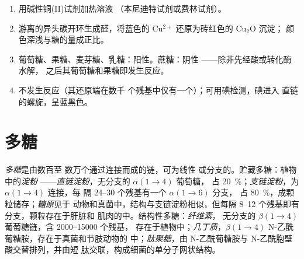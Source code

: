 \begin{method}[检验还原糖]\label{met:b1:carbohydrates:reducing}
\begin{enumerate}
  \item 用碱性铜(II)试剂加热溶液
        （本尼迪特试剂或费林试剂）。
  \item 游离的异头碳开环生成醛，将蓝色的
        $\mathrm{Cu^{2+}}$ 还原为砖红色的 $\mathrm{Cu_2O}$ 沉淀；
        颜色深浅与糖的量成正比。
  \item 葡萄糖、果糖、麦芽糖、乳糖：阳性。蔗糖：阴性
——除非先经酸或转化酶水解，
        之后其葡萄糖和果糖即发生反应。
  \item {}不发生反应（其还原端在数千
        个残基中仅有一个）；可用碘检测，碘进入
        直链的螺旋，呈蓝黑色。
\end{enumerate}
\end{method}

\section{多糖}

\begin{definition}[多糖]\label{def:b1:carbohydrates:polysaccharide}
\emph{多糖}是由数百至
数万个通过连接而成的链，可为线性
或分支的。贮藏多糖：植物中的\emph{淀粉}
——\emph{直链淀粉}，无分支的 $\alpha(1{\to}4)$ 葡萄糖，
占 \qty{20}{\%}；\emph{支链淀粉}，为 $\alpha(1{\to}4)$ 连接，每
隔 \qtyrange{24}{30}{} 个残基有一个 $\alpha(1{\to}6)$ 分支，
占 \qty{80}{\%}，成颗粒储存；\emph{糖原}见于
动物和真菌中，结构与支链淀粉相似，但每隔
\qtyrange{8}{12}{} 个残基即有分支，颗粒存在于肝脏和
肌肉的中。结构性多糖：\emph{纤维素}，
无分支的 $\beta(1{\to}4)$ 葡萄糖链，含 \qtyrange{2000}{15000}{} 个残基，
存在于植物中；\emph{几丁质}，$\beta(1{\to}4)$
N-乙酰葡糖胺，存在于真菌和节肢动物的
中；\emph{肽聚糖}，由
N-乙酰葡糖胺与 N-乙酰胞壁酸交替排列，并由短
肽交联，构成细菌的单分子网状结构。
\end{definition}


